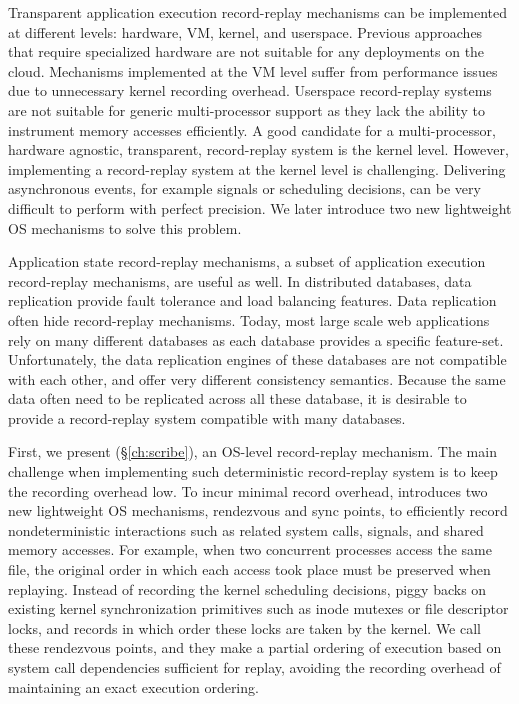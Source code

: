 Transparent application execution record-replay mechanisms can be implemented at different levels:
hardware, VM, kernel, and userspace. Previous approaches that require
specialized hardware are not suitable for any deployments on the cloud.
Mechanisms implemented at the VM level suffer from performance issues
due to unnecessary kernel recording overhead.  Userspace record-replay systems
are not suitable for generic multi-processor support as they lack the ability to
instrument memory accesses efficiently. A good candidate for
a multi-processor, hardware agnostic, transparent, record-replay system is the
kernel level. However, implementing a record-replay system at the kernel level
is challenging. Delivering asynchronous events, for example signals or
scheduling decisions, can be very difficult to perform with perfect precision.
We later introduce two new lightweight OS mechanisms to solve this problem.

Application state record-replay mechanisms, a subset of application execution
record-replay mechanisms, are useful as well.  In distributed
databases, data replication provide fault tolerance and load balancing
features. Data replication often hide record-replay mechanisms.
Today, most large scale web applications rely on many different databases as
each database provides a specific feature-set. Unfortunately, the data replication
engines of these databases are not compatible with each other, and offer very
different consistency semantics. Because the same data often need to be
replicated across all these database, it is desirable to provide a
record-replay system compatible with many databases.

First, we present \scribe (\S\ref{ch:scribe}), an OS-level record-replay
mechanism. The main challenge when implementing such deterministic record-replay
system is to keep the recording overhead low. To incur minimal record overhead,
\scribe introduces two new lightweight OS mechanisms, rendezvous and sync
points, to efficiently record nondeterministic interactions such as related
system calls, signals, and shared memory accesses. For example, when
two concurrent processes access the same file, the original order in which
each access took place must be preserved when replaying.
Instead of recording the kernel scheduling decisions, \scribe piggy backs on
existing kernel synchronization primitives such as inode mutexes or file
descriptor locks, and records in which order these locks are taken by the kernel.
We call these rendezvous points, and they make a partial ordering of execution
based on system call dependencies sufficient for replay, avoiding the recording
overhead of maintaining an exact execution ordering.

